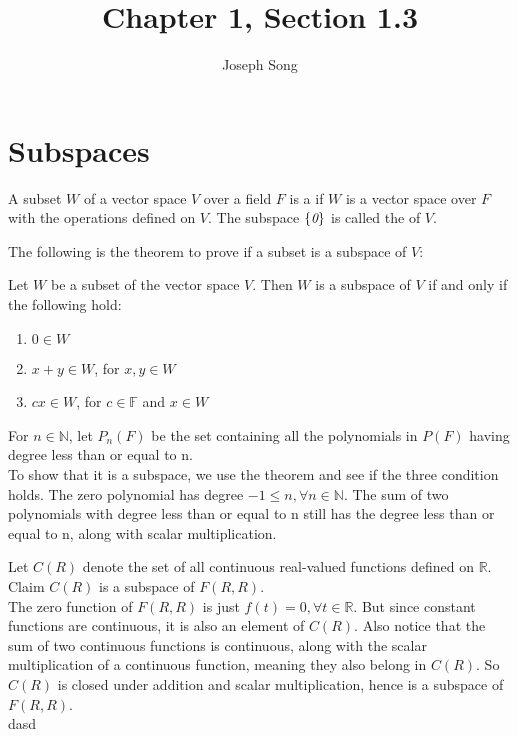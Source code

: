 \documentclass{article}
\title{Chapter 1, Section 1.3}
\author{Joseph Song}
\date{}
\begin{document}
 
 \maketitle
 
 \section{Subspaces}
 
 \begin{definition}[Subspace]
 A subset $W$ of a vector space $V$ over a field $F$ is a  if $W$ is a vector space over $F$ with the operations defined on $V$. The subspace $\{ \emph{0} \}$ is called the  of $V$.
 \end{definition}
 
 The following is the theorem to prove if a subset is a subspace of $V$:
 \begin{theorem}
     Let $W$ be a subset of the vector space $V$. Then $W$ is a subspace of $V$ if and only if the following hold:
 \end{theorem}
 \begin{enumerate}[label=(\arabic*)]
     \item $0 \in W$
     \item $x + y \in W$, for $x, y \in W$
     \item $cx \in W$, for $c \in \mathbb{F}$ and $x \in W$
 \end{enumerate}
 \begin{example}[Polynomials]
 \end{example}
 For $n \in \mathbb{N}$, let $P_n(F)$ be the set containing all the polynomials in $P(F)$ having degree less than or equal to n.
 \\
 To show that it is a subspace, we use the theorem and see if the three condition holds. The zero polynomial has degree $-1 \leq n, \forall n \in \mathbb{N}$.
 The sum of two polynomials with degree less than or equal to n still has the degree less than or equal to n, along with scalar multiplication.
 
 \begin{example}[Functions]
 \end{example}
 
 Let $C(R)$ denote the set of all continuous real-valued functions defined on $\mathbb{R}$. Claim $C(R)$ is a subspace of $F(R, R)$.
 \\
 The zero function of $F(R,R)$ is just $f(t) = 0, \forall t\in \mathbb{R}$. But since constant functions are continuous, it is also an element of $C(R)$. Also notice that the sum of two continuous functions is continuous, along with the scalar multiplication of a continuous function, meaning they also belong in $C(R)$. So $C(R)$ is closed under addition and scalar multiplication, hence is a subspace of $F(R,R)$.
 \\
dasd
 
\end{document}
